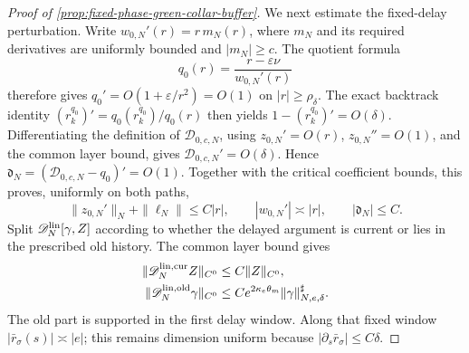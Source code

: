 \begin{proof}[Proof of
\cref{prop:fixed-phase-green-collar-buffer}]
We next estimate the fixed-delay perturbation.  Write
\(w_{0,N}'(r)=r\,m_N(r)\), where \(m_N\) and its required derivatives are
uniformly bounded and \(|m_N|\ge c\).  The quotient formula
\[
 q_0(r)=\frac{r-\varepsilon\nu}{w_{0,N}'(r)}
\]
therefore gives \(q_0'=O(1+\varepsilon/r^2)=O(1)\) on
\(|r|\ge\rho_\delta\).  The exact backtrack identity
\((r_k^{q_0})'=q_0(r_k^{q_0})/q_0(r)\) then yields
\(1-(r_k^{q_0})'=O(\delta)\).  Differentiating the definition of
\(\mathcal D_{0,c,N}\), using \(z_{0,N}'=O(r)\),
\(z_{0,N}''=O(1)\), and the common layer bound, gives
\(\mathcal D_{0,c,N}'=O(\delta)\).  Hence
\(\mathfrak d_N=(\mathcal D_{0,c,N}-q_0)'=O(1)\).  Together with the critical
coefficient bounds, this proves, uniformly on both paths,
\begin{equation}
 \|z_{0,N}'\|_N+\|\ell_N\|\le C|r|,\qquad
 |w_{0,N}'|\asymp|r|,\qquad |\mathfrak d_N|\le C.  \label{eq:fixed-phase-coefficient-bounds}
\end{equation}
Split \(\mathscr D_N^{\rm lin}[\gamma,Z]\) according to whether the delayed argument
is current or lies in the prescribed old history.  The common layer bound
gives
\begin{align}
 \|\mathscr D_N^{{\rm lin},{\rm cur}}Z\|_{C^0}
 &\le C\|Z\|_{C^0},\notag\\
 \|\mathscr D_N^{{\rm lin},{\rm old}}\gamma\|_{C^0}
 &\le Ce^{2\kappa_e\theta_m}
       \|\gamma\|_{N,e,\delta}^{\sharp}.          \label{eq:fixed-phase-delay-split-bound}
\end{align}
The old part is supported in the first delay window.  Along that fixed
window \(|\bar r_\sigma(s)|\asymp|e|\); this remains dimension uniform
because \(|\partial_s\bar r_\sigma|\le C\delta\).


\end{proof}
